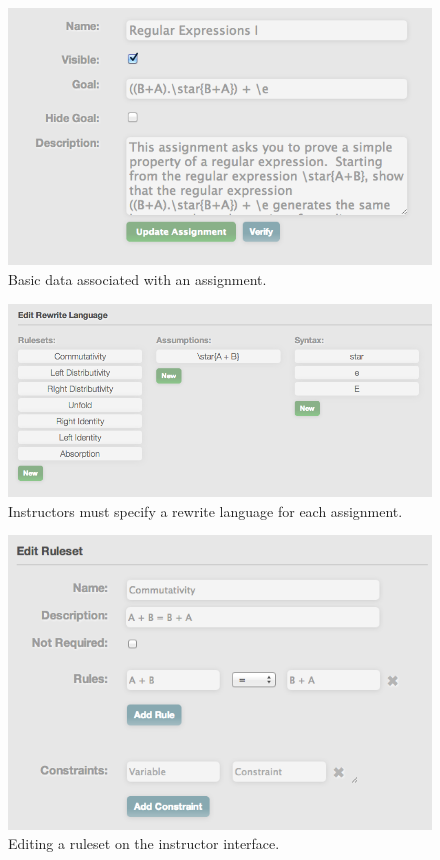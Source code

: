\documentclass{sigchi}
\begin{document}
\begin{figure}[!h]
\centering
\includegraphics[width=1\columnwidth]{assign_meta}
\caption{Basic data associated with an assignment.}
\label{fig:assign_meta}
\end{figure}

\begin{figure}[!h]
\centering
\includegraphics[width=1\columnwidth]{rewrite_language}
\caption{Instructors must specify a rewrite language for each assignment.}
\label{fig:rewrite_language}
\end{figure}

\begin{figure}[!h]
\centering
\includegraphics[width=1\columnwidth]{editruleset}
\caption{Editing a ruleset on the instructor interface.}
\label{fig:editruleset}
\end{figure}
\end{document}
